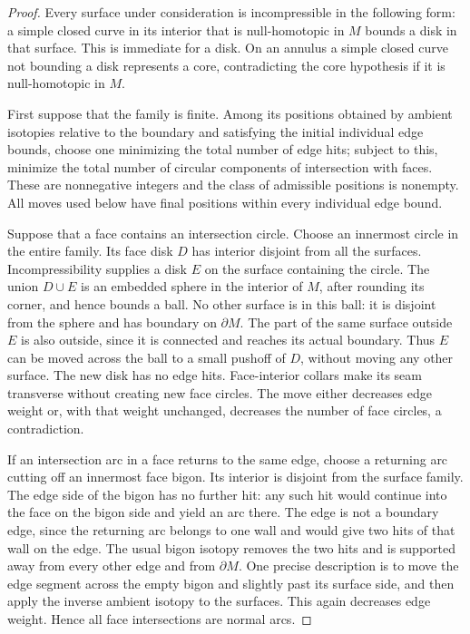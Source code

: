 \begin{proof}
Every surface under consideration is incompressible in the following form:
a simple closed curve in its interior that is null-homotopic in $M$ bounds a
disk in that surface.  This is immediate for a disk.  On an annulus a simple
closed curve not bounding a disk represents a core, contradicting the core
hypothesis if it is null-homotopic in $M$.

First suppose that the family is finite.  Among its positions obtained by
ambient isotopies relative to the boundary and satisfying the initial
individual edge bounds, choose one minimizing the total number of edge hits;
subject to this, minimize the total number of circular components of
intersection with faces.  These are nonnegative integers and the class of
admissible positions is nonempty.  All moves used below have final positions
within every individual edge bound.

Suppose that a face contains an intersection circle.  Choose an innermost
circle in the entire family.  Its face disk $D$ has interior disjoint from all
the surfaces.  Incompressibility supplies a disk $E$ on the surface containing
the circle.  The union $D\cup E$ is an embedded sphere in the interior of $M$,
after rounding its corner, and hence bounds a ball.  No other surface is in
this ball: it is disjoint from the sphere and has boundary on $\partial M$.
The part of the same surface outside $E$ is also outside, since it is connected
and reaches its actual boundary.  Thus $E$ can be moved across the ball to a
small pushoff of $D$, without moving any other surface.  The new disk has no
edge hits.  Face-interior collars make its seam transverse without creating
new face circles.  The move either decreases edge weight or, with that weight
unchanged, decreases the number of face circles, a contradiction.

If an intersection arc in a face returns to the same edge, choose a returning
arc cutting off an innermost face bigon.  Its interior is disjoint from the
surface family.  The edge side of the bigon has no further hit: any such hit
would continue into the face on the bigon side and yield an arc there.  The
edge is not a boundary edge, since the returning arc belongs to one wall and
would give two hits of that wall on the edge.  The usual bigon isotopy removes
the two hits and is supported away from every other edge and from
$\partial M$.  One precise description is to move the edge segment across
the empty bigon and slightly past its surface side, and then apply the inverse
ambient isotopy to the surfaces.  This again decreases edge weight.  Hence
all face intersections are normal arcs.


\end{proof}
